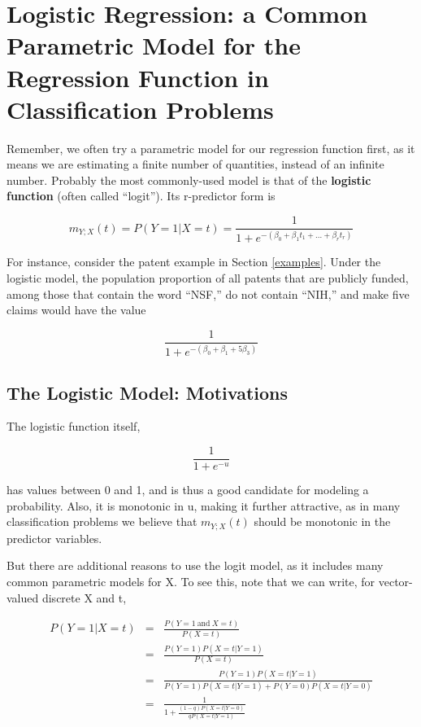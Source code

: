 \section{Logistic Regression:  a Common Parametric Model for the
Regression Function in Classification Problems}
\label{logitsec}

Remember, we often try a parametric model for our regression function
first, as it means we are estimating a finite number of quantities,
instead of an infinite number.  Probably the most commonly-used model is
that of the {\bf logistic function} (often called ``logit'').  Its
r-predictor form is 

\begin{equation}
\label{logit2}
m_{Y;X}(t) = P(Y = 1 | X = t) = \frac{1}{1+e^{-(\beta_0+\beta_1
t_1+...+\beta_r t_r)}}
\end{equation}

For instance, consider the patent example in Section \ref{examples}.
Under the logistic model, the population proportion of all patents that
are publicly funded, among those that contain the word ``NSF,'' do not
contain ``NIH,'' and make five claims would have the value

\begin{equation}
\frac{1}{1+e^{-(\beta_0 + \beta_1 + 5\beta_3)}}
\end{equation}

\subsection{The Logistic Model:  Motivations}
\label{logitmotivations}

The logistic function itself, 

\begin{equation}
\frac{1}{1+e^{-u}}
\end{equation}

has values between 0 and 1, and is thus a good candidate for modeling a
probability.  Also, it is monotonic in u, making it further attractive,
as in many classification problems we believe that $m_{Y;X}(t)$ should
be monotonic in the predictor variables.

But there are additional reasons to use the logit model, as it includes
many common parametric models for X.  To see this, note that we can
write, for vector-valued discrete X and t,

\begin{eqnarray}
\label{oneonelogodds}
P(Y = 1 | X = t) &=&  \frac{P(Y = 1 ~ \textrm{and} ~ X = t)}{P(X = t)} \\
&=& \frac{P(Y = 1) P(X = t | Y = 1)}{P(X = t)} \\
&=& \frac{P(Y = 1) P(X = t | Y = 1)}
{P(Y = 1) P(X = t | Y = 1) + P(Y = 0) P(X = t | Y = 0)} \\
\label{intermedone}
&=& \frac{1}
{1 + \frac{(1-q) P(X = t | Y = 0)}{q P(X = t | Y = 1)}}
\label{finaloneone}
\end{eqnarray}

